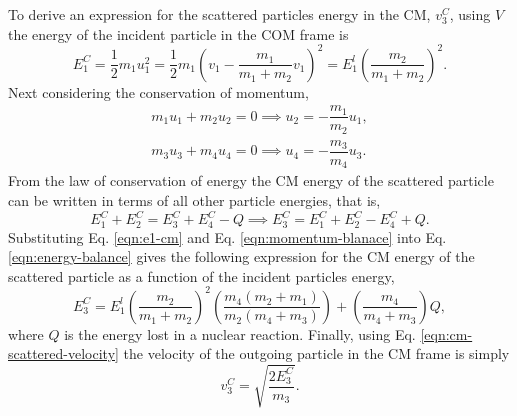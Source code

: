 \documentclass[../main.tex]{subfiles}
\begin{document}
To derive an expression for the scattered particles energy in the CM, $v_3^C$, using $V$ the energy of the incident particle in the COM frame is
\begin{equation} \label{eqn:e1-cm}
  E_1^C = \dfrac{1}{2} m_1 u_1^2 = \dfrac{1}{2} m_1 \left( v_1 - \dfrac{m_1}{m_1 + m_2} v_1 \right)^2 = E_1^l \left( \dfrac{m_2}{m_1+m_2} \right)^2.
\end{equation}
Next considering the conservation of momentum,
\begin{gather} \label{eqn:momentum-blanace}
  m_1 u_1 + m_2 u_2 = 0 \implies u_2 = -\dfrac{m_1}{m_2} u_1, \\
  m_{3} u_{3} + m_{4} u_{4} = 0 \implies u_{4} = -\dfrac{m_{3}}{m_{4}} u_{3}.
\end{gather} 
From the law of conservation of energy the CM energy of the scattered particle can be written in terms of all other particle energies, that is,
\begin{equation} \label{eqn:energy-balance}
  E_1^C + E_2^C = E_3^C + E_4^C - Q \implies E_3^C = E_1^C + E_2^C - E_4^C + Q.
\end{equation}
Substituting Eq. \eqref{eqn:e1-cm} and Eq. \eqref{eqn:momentum-blanace} into Eq. \eqref{eqn:energy-balance} gives the following expression for the CM energy of the scattered particle as a function of the incident particles energy,
\begin{equation} \label{eqn:cm-scattered-velocity}
  E_{3}^C = E_1^l \left( \dfrac{m_2}{m_1+m_2} \right)^2 \left(\dfrac{m_{4}(m_2 + m_1)}{m_2(m_{4}+m_{3})}\right) + \left(\dfrac{m_{4}}{m_{4}+m_{3}}\right) Q,
\end{equation}
where $Q$ is the energy lost in a nuclear reaction. Finally, using Eq. \eqref{eqn:cm-scattered-velocity} the velocity of the outgoing particle in the CM frame is simply
\begin{equation}
  v_{3}^C = \sqrt{\frac{2 E_{3}^C}{m_{3}}}.
\end{equation}
\end{document}
